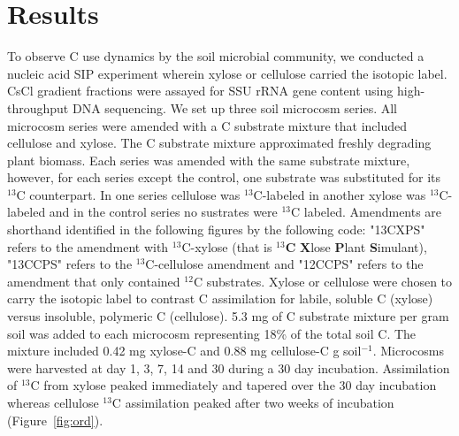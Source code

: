 \section{Results}
To observe C use dynamics by the soil microbial community, we conducted a
nucleic acid SIP experiment wherein xylose or cellulose carried the isotopic
label. CsCl gradient fractions were assayed for SSU rRNA gene content using
high-throughput DNA sequencing. We set up three soil microcosm series. All
microcosm series were amended with a C substrate mixture
that included cellulose and xylose. The C substrate mixture approximated
freshly degrading plant biomass. Each series was amended with the same
substrate mixture, however, for each series except the control, one substrate
was substituted for its $^{13}$C counterpart. In one series cellulose was
$^{13}$C-labeled in another xylose was $^{13}$C-labeled and in the control
series no sustrates were $^{13}$C labeled.  Amendments are shorthand identified
in the following figures by the following code: "13CXPS" refers to the
amendment with $^{13}$C-xylose (that is $^{13}$\textbf{C} \textbf{X}lose
\textbf{P}lant \textbf{S}imulant), "13CCPS" refers to the $^{13}$C-cellulose
amendment and "12CCPS" refers to the amendment that only contained $^{12}$C
substrates.  Xylose or cellulose were chosen to carry the isotopic label to
contrast C assimilation for labile, soluble C (xylose) versus
insoluble, polymeric C (cellulose).  5.3 mg of C substrate mixture per gram
soil was added to each microcosm representing 18\% of the total soil C. The
mixture included 0.42 mg xylose-C and 0.88 mg cellulose-C g soil$^{-1}$.
Microcosms were harvested at day 1, 3, 7, 14 and 30  during a 30 day
incubation. Assimilation of $^{13}$C from xylose peaked immediately and tapered
over the 30 day incubation whereas cellulose $^{13}$C assimilation peaked after
two weeks of incubation (Figure~\ref{fig:ord}).
